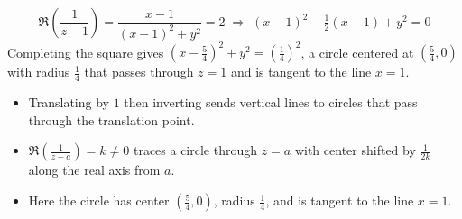 \begin{solution}[Sketch]
\[
\Re\!\left(\frac{1}{z-1}\right) = \frac{x-1}{(x-1)^2 + y^2} = 2 \;\Rightarrow\; (x-1)^2 - \tfrac{1}{2}(x-1) + y^2 = 0
\]
Completing the square gives $\left(x - \tfrac{5}{4}\right)^2 + y^2 = \left(\tfrac{1}{4}\right)^2$, a circle centered at $(\tfrac{5}{4}, 0)$ with radius $\tfrac{1}{4}$ that passes through $z = 1$ and is tangent to the line $x = 1$.

\vspace{0.4em}
\begin{center}
\end{center}
\vspace{0.4em}

\end{solution}

\begin{takeaways}
 
\begin{itemize}[leftmargin=*]
  \item Translating by $1$ then inverting sends vertical lines to circles that pass through the translation point.
  \item $\Re\!\left(\frac{1}{z-a}\right) = k \ne 0$ traces a circle through $z = a$ with center shifted by $\frac{1}{2k}$ along the real axis from $a$.
  \item Here the circle has center $(\tfrac{5}{4}, 0)$, radius $\tfrac{1}{4}$, and is tangent to the line $x = 1$.
\end{itemize}

\end{takeaways}


